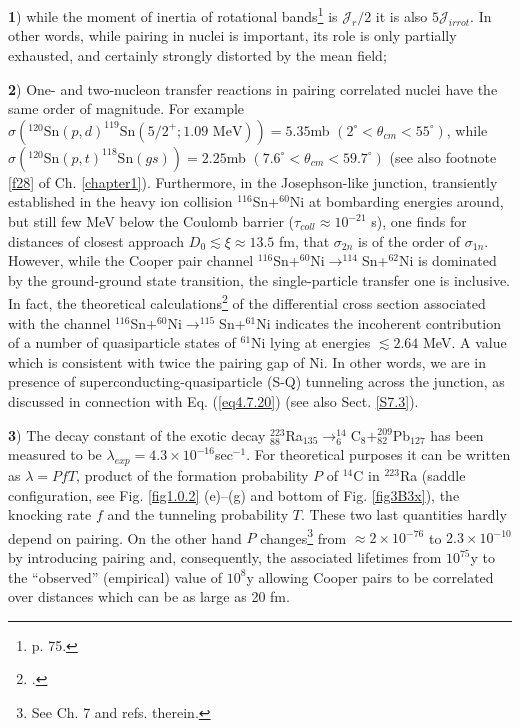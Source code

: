   \textbf{1}) while the moment of inertia of rotational bands\footnote{\cite{Bohr:75} p. 75.} is $\mathcal J_r/2$ it is also $5 \mathcal J_{irrot}$. In other words, while pairing in nuclei is important, its role is only partially exhausted, and certainly strongly distorted by the mean field; 
  
  \textbf{2}) One- and two-nucleon transfer reactions in pairing correlated nuclei have the same order of magnitude. 
   For example $\sigma (^{120}\text{Sn}(p,d)^{119}\text{Sn}(5/2^+; 1.09 \text{ MeV}))=5.35 $mb $(2^\circ<\theta_{cm}<55^\circ)$, while $\sigma (^{120}\text{Sn}(p,t)^{118}\text{Sn}(gs))=2.25 $mb $(7.6^\circ<\theta_{cm}<59.7^\circ)$ (see also footnote \ref{f28} of  Ch. \ref{chapter1}). Furthermore, in the Josephson-like junction, transiently established in the heavy ion collision $^{116}$Sn+$^{60}$Ni at bombarding energies around, but still few MeV below the Coulomb barrier ($\tau_{coll}\approx10^{-21}$ s), one finds for distances of closest approach $D_0\lesssim\xi\approx13.5$ fm, that $\sigma_{2n}$ is of the order of $\sigma_{1n}$. However, while the Cooper pair channel $^{116}$Sn+$^{60}$Ni$\to^{114}$Sn+$^{62}$Ni is dominated by the ground-ground state transition, the single-particle transfer one is inclusive. In fact, the theoretical calculations\footnote{\cite{Montanari:14,Potel:20b}.} of the differential cross section  associated with the channel $^{116}$Sn+$^{60}$Ni$\to^{115}$Sn+$^{61}$Ni indicates the incoherent contribution of a number of quasiparticle states of $^{61}$Ni lying at energies $\lesssim2.64$ MeV. A value which is consistent with twice the pairing gap of Ni. In other words, we are in presence of superconducting-quasiparticle (S-Q) tunneling across the junction, as discussed in connection with Eq. (\ref{eq4.7.20}) (see also Sect. \ref{S7.3}).
  
  
   \textbf{3}) The decay constant of the exotic decay $^{223}_{88}$Ra$_{135}\rightarrow^{14}_6$C$_8+^{209}_{82}$Pb$_{127}$ has been measured to be $\lambda_{exp}=4.3\times10^{-16}$sec$^{-1}$. For theoretical purposes it can be written as $\lambda=PfT$, product of the formation probability $P$ of $^{14}$C in $^{223}$Ra (saddle configuration, see Fig. \ref{fig1.0.2} (e)--(g) and bottom of Fig. \ref{fig3B3x}), the knocking rate $f$ and the tunneling probability $T$. These two last quantities hardly depend on pairing. On the other hand $P$ changes\footnote{See \cite{Brink:05} Ch. 7 and refs. therein.} from $\approx 2\times10^{-76}$ to $2.3\times10^{-10}$ by introducing pairing and, consequently, the associated lifetimes from $10^{75}$y to the ``observed'' (empirical) value of $10^8$y  allowing Cooper pairs to be correlated over distances which can be as large as 20 fm.
 
